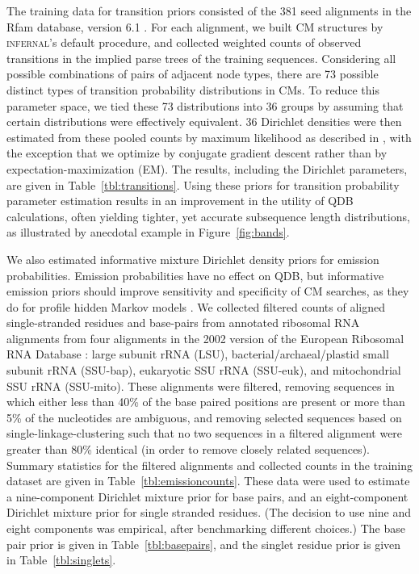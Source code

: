 \documentclass[11pt]{article}
\newif\ifdraft
\begin{document}
The training data for transition priors consisted of the 381 seed
alignments in the Rfam database, version 6.1
\cite{Griffiths-Jones05}. For each alignment, we built CM structures
by \textsc{infernal}'s default procedure, and collected weighted
counts of observed transitions in the implied parse trees of the
training sequences. Considering all possible combinations of pairs of
adjacent node types, there are 73 possible distinct types of
transition probability distributions in CMs. To reduce this parameter
space, we tied these 73 distributions into 36 groups by assuming that
certain distributions were effectively equivalent.  36 Dirichlet
densities were then estimated from these pooled counts by maximum
likelihood as described in \cite{Sjolander96}, with the exception that
we optimize by conjugate gradient descent \cite{Press93} rather than
by expectation-maximization (EM).  The results, including the
Dirichlet parameters, are given in Table~\ref{tbl:transitions}.  Using
these priors for transition probability parameter estimation results
in an improvement in the utility of QDB calculations, often yielding
tighter, yet accurate subsequence length distributions, as illustrated
by anecdotal example in Figure~\ref{fig:bands}.

\ifdraft

%
\fi

We also estimated informative mixture Dirichlet density priors for
emission probabilities.  Emission probabilities have no effect on QDB,
but informative emission priors should improve sensitivity and
specificity of CM searches, as they do for profile hidden Markov
models \cite{BrownM93,Sjolander96}. We collected filtered counts of
aligned single-stranded residues and base-pairs from annotated
ribosomal RNA alignments from four alignments in the 2002 version of
the European Ribosomal RNA Database \cite{Wuyts01, Wuyts02}: large
subunit rRNA (LSU), bacterial/archaeal/plastid small subunit rRNA
(SSU-bap), eukaryotic SSU rRNA (SSU-euk), and mitochondrial SSU rRNA
(SSU-mito). These alignments were filtered, removing sequences in
which either less than 40\% of the base paired positions are present
or more than 5\% of the nucleotides are ambiguous, and removing
selected sequences based on single-linkage-clustering such that no two
sequences in a filtered alignment were greater than 80\% identical (in
order to remove closely related sequences). Summary statistics for the
filtered alignments and collected counts in the training dataset are
given in Table~\ref{tbl:emissioncounts}. These data were used to
estimate a nine-component Dirichlet mixture prior for base pairs, and
an eight-component Dirichlet mixture prior for single stranded
residues. (The decision to use nine and eight components was
empirical, after benchmarking different choices.) The base pair prior
is given in Table~\ref{tbl:basepairs}, and the singlet residue prior
is given in Table~\ref{tbl:singlets}.
\end{document}
